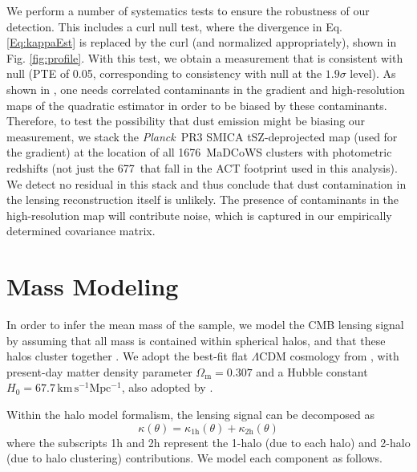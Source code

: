 \documentclass[preprint2]{aastex63}
\newcommand{\nclusters}{677~}
\newcommand{\tnclusters}{1676~}
\newcommand{\curlpte}{0.05}
\newcommand{\curlsigma}{1.9}
\newcommand{\Planck}{{\it Planck}}
\begin{document}
We perform a number of systematics tests to ensure the robustness of our detection. This includes a curl null test, where the divergence in Eq. \ref{Eq:kappaEst} is replaced by the curl (and normalized appropriately), shown in Fig. \ref{fig:profile}. With this test, we obtain a measurement that is consistent with null (PTE of \curlpte, corresponding to consistency with null at the $\curlsigma\sigma$ level). As shown in \cite{1802.08230}, one needs correlated contaminants in the gradient and high-resolution maps of the quadratic estimator in order to be biased by these contaminants. Therefore, to test the possibility that dust emission might be biasing our measurement, we stack the \Planck\ PR3 SMICA tSZ-deprojected map (used for the gradient) at the location of all \tnclusters MaDCoWS clusters with photometric redshifts (not just the \nclusters that fall in the ACT footprint used in this analysis). We detect no residual in this stack and thus conclude that dust contamination in the lensing reconstruction itself is unlikely. The presence of contaminants in the high-resolution map will contribute noise, which is captured in our empirically determined covariance matrix.


\section{Mass Modeling}\label{app:model}

In order to infer the mean mass of the sample, we model the CMB lensing signal by assuming that all mass is contained within spherical halos, and that these halos cluster together \citep[i.e., using the `halo model';][]{peacock00,seljak00}. We adopt the best-fit flat $\Lambda$CDM cosmology from \cite{Planck2015Cosmo}, with present-day matter density parameter $\Omega_\mathrm{m}=0.307$ and a Hubble constant $H_0=67.7\,\mathrm{km\,s^{-1}Mpc^{-1}}$, also adopted by \cite{gonzalez19}.

Within the halo model formalism, the lensing signal can be decomposed as
\begin{equation}\label{eq:kappa_tot}
    \kappa(\theta) = 
        \kappa_\mathrm{1h}(\theta) + \kappa_\mathrm{2h}(\theta)
\end{equation}
where the subscripts 1h and 2h represent the 1-halo (due to each halo) and 2-halo (due to halo clustering) contributions. We model each component as follows.
\end{document}
